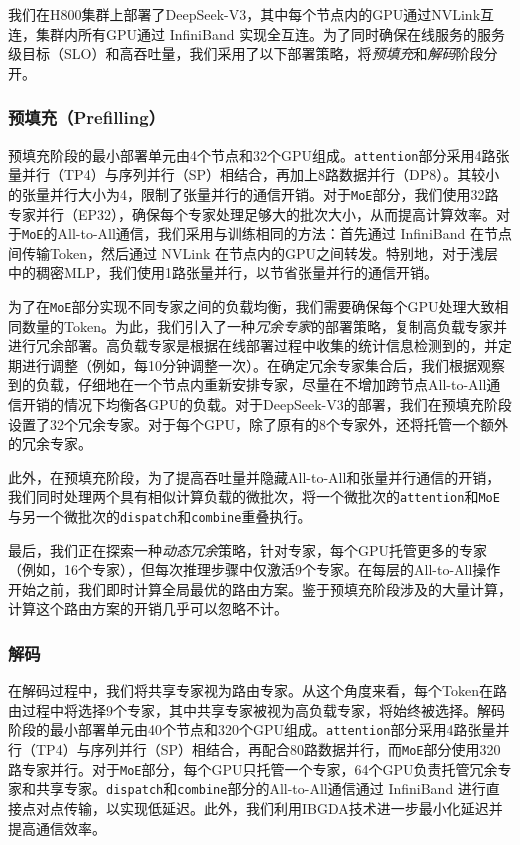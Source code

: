 \documentclass[lang=cn,a4paper,newtx]{elegantpaper}
\newcommand{\dsviii}{DeepSeek-V3}
\begin{document}
我们在H800集群上部署了\dsviii{}，其中每个节点内的GPU通过NVLink互连，集群内所有GPU通过 InfiniBand 实现全互连。为了同时确保在线服务的服务级目标（SLO）和高吞吐量，我们采用了以下部署策略，将\textit{预填充}和\textit{解码}阶段分开。

\subsubsection{预填充（Prefilling）}

预填充阶段的最小部署单元由4个节点和32个GPU组成。\texttt{attention}部分采用4路张量并行（TP4）与序列并行（SP）相结合，再加上8路数据并行（DP8）。其较小的张量并行大小为4，限制了张量并行的通信开销。对于\texttt{MoE}部分，我们使用32路专家并行（EP32），确保每个专家处理足够大的批次大小，从而提高计算效率。对于\texttt{MoE}的All-to-All通信，我们采用与训练相同的方法：首先通过 InfiniBand 在节点间传输Token，然后通过 NVLink 在节点内的GPU之间转发。特别地，对于浅层中的稠密MLP，我们使用1路张量并行，以节省张量并行的通信开销。

为了在\texttt{MoE}部分实现不同专家之间的负载均衡，我们需要确保每个GPU处理大致相同数量的Token。为此，我们引入了一种\textit{冗余专家}的部署策略，复制高负载专家并进行冗余部署。高负载专家是根据在线部署过程中收集的统计信息检测到的，并定期进行调整（例如，每10分钟调整一次）。在确定冗余专家集合后，我们根据观察到的负载，仔细地在一个节点内重新安排专家，尽量在不增加跨节点All-to-All通信开销的情况下均衡各GPU的负载。对于\dsviii{}的部署，我们在预填充阶段设置了32个冗余专家。对于每个GPU，除了原有的8个专家外，还将托管一个额外的冗余专家。

此外，在预填充阶段，为了提高吞吐量并隐藏All-to-All和张量并行通信的开销，我们同时处理两个具有相似计算负载的微批次，将一个微批次的\texttt{attention}和\texttt{MoE}与另一个微批次的\texttt{dispatch}和\texttt{combine}重叠执行。

最后，我们正在探索一种\textit{动态冗余}策略，针对专家，每个GPU托管更多的专家（例如，16个专家），但每次推理步骤中仅激活9个专家。在每层的All-to-All操作开始之前，我们即时计算全局最优的路由方案。鉴于预填充阶段涉及的大量计算，计算这个路由方案的开销几乎可以忽略不计。

\subsubsection{解码}

在解码过程中，我们将共享专家视为路由专家。从这个角度来看，每个Token在路由过程中将选择9个专家，其中共享专家被视为高负载专家，将始终被选择。解码阶段的最小部署单元由40个节点和320个GPU组成。\texttt{attention}部分采用4路张量并行（TP4）与序列并行（SP）相结合，再配合80路数据并行，而\texttt{MoE}部分使用320路专家并行。对于\texttt{MoE}部分，每个GPU只托管一个专家，64个GPU负责托管冗余专家和共享专家。\texttt{dispatch}和\texttt{combine}部分的All-to-All通信通过 InfiniBand 进行直接点对点传输，以实现低延迟。此外，我们利用IBGDA技术进一步最小化延迟并提高通信效率。
\end{document}
